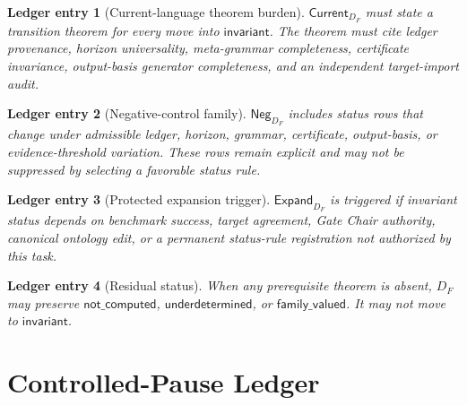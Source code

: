 \documentclass[11pt]{article}
\newcommand{\Neg}{\mathsf{Neg}}
\newcommand{\Current}{\mathsf{Current}}
\newcommand{\Expand}{\mathsf{Expand}}
\newtheorem{ledgerentry}{Ledger entry}
\begin{document}
\begin{ledgerentry}[Current-language theorem burden]
\(\Current_{D_F}\) must state a transition theorem for every move into
\(\mathsf{invariant}\). The theorem must cite ledger provenance, horizon
universality, meta-grammar completeness, certificate invariance,
output-basis generator completeness, and an independent target-import audit.
\end{ledgerentry}

\begin{ledgerentry}[Negative-control family]
\(\Neg_{D_F}\) includes status rows that change under admissible ledger,
horizon, grammar, certificate, output-basis, or evidence-threshold variation.
These rows remain explicit and may not be suppressed by selecting a favorable
status rule.
\end{ledgerentry}

\begin{ledgerentry}[Protected expansion trigger]
\(\Expand_{D_F}\) is triggered if invariant status depends on benchmark
success, target agreement, Gate Chair authority, canonical ontology edit, or
a permanent status-rule registration not authorized by this task.
\end{ledgerentry}

\begin{ledgerentry}[Residual status]
When any prerequisite theorem is absent, \(D_F\) may preserve
\(\mathsf{not\_computed}\), \(\mathsf{underdetermined}\), or
\(\mathsf{family\_valued}\). It may not move to \(\mathsf{invariant}\).
\end{ledgerentry}

\section{Controlled-Pause Ledger}
\end{document}
